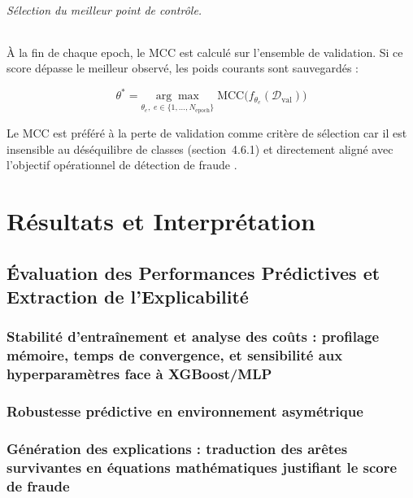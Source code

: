 \documentclass[11pt,a4paper,oneside]{report}
\theoremstyle{definition}
\theoremstyle{remark}
\begin{document}
\paragraph{Sélection du meilleur point de contrôle.}
À la fin de chaque epoch, le MCC est calculé sur l'ensemble de validation. Si ce score dépasse le meilleur observé, les poids courants sont sauvegardés :

\begin{equation}
    \theta^* = \underset{\theta_e,\; e \in \{1,\ldots,N_{\text{epoch}}\}}{\arg\max}\;
               \mathrm{MCC}\!\bigl(f_{\theta_e}(\mathcal{D}_{\text{val}})\bigr)
    \label{eq:bestckpt}
\end{equation}

Le MCC est préféré à la perte de validation comme critère de sélection car il est insensible au déséquilibre de classes (section~4.6.1) et directement aligné avec l'objectif opérationnel de détection de fraude \citep{azamuke2025rich}.

\part{Résultats et Interprétation}

\chapter{Évaluation des Performances Prédictives et Extraction de l'Explicabilité}

\section{Stabilité d'entraînement et analyse des coûts : profilage mémoire, temps de convergence, et sensibilité aux hyperparamètres face à XGBoost/MLP}

\section{Robustesse prédictive en environnement asymétrique}

\section{Génération des explications : traduction des arêtes survivantes en équations mathématiques justifiant le score de fraude}
\end{document}
